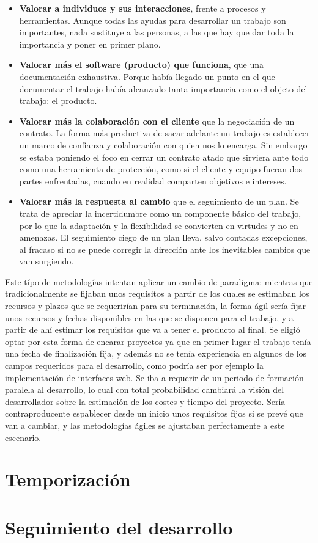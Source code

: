 \begin{itemize}
    \item \textbf{Valorar a individuos y sus interacciones}, frente a procesos y herramientas. Aunque todas las ayudas para desarrollar un trabajo son importantes, nada sustituye a las personas, a las que hay que dar toda la importancia y poner en primer plano.
    \item \textbf{Valorar más el software (producto) que funciona}, que una documentación exhaustiva. Porque había llegado un punto en el que documentar el trabajo había alcanzado tanta importancia como el objeto del trabajo: el producto.
    \item \textbf{Valorar más la colaboración con el cliente} que la negociación de un contrato. La forma más productiva de sacar adelante un trabajo es establecer un marco de confianza y colaboración con quien nos lo encarga. Sin embargo se estaba poniendo el foco en cerrar un contrato atado que sirviera ante todo como una herramienta de protección, como si el cliente y equipo fueran dos partes enfrentadas, cuando en realidad comparten objetivos e intereses.
    \item \textbf{Valorar más la respuesta al cambio} que el seguimiento de un plan. Se trata de apreciar la incertidumbre como un componente básico del trabajo, por lo que la adaptación y la flexibilidad se convierten en virtudes y no en amenazas. El seguimiento ciego de un plan lleva, salvo contadas excepciones, al fracaso si no se puede corregir la dirección ante los inevitables cambios que van surgiendo.
\end{itemize}

Este típo de metodologías intentan aplicar un cambio de paradigma: mientras que tradicionalmente se fijaban unos requisitos a partir de los cuales se estimaban los recursos y plazos que se requerirían para su terminación, la forma ágil sería fijar unos recursos y fechas disponibles en las que se disponen para el trabajo, y a partir de ahí estimar los requisitos que va a tener el producto al final. Se eligió optar por esta forma de encarar proyectos ya que en primer lugar el trabajo tenía una fecha de finalización fíja, y además no se tenía experiencia en algunos de los campos requeridos para el desarrollo, como podría ser por ejemplo la implementación de interfaces web. Se iba a requerir de un periodo de formación paralela al desarrollo, lo cual con total probabilidad cambiará la visión del desarrollador sobre la estimación de los costes y tiempo del proyecto. Sería contraproducente espablecer desde un inicio unos requisitos fijos si se prevé que van a cambiar, y  las metodologías ágiles se ajustaban perfectamente a este escenario.

\section{Temporización}

\section{Seguimiento del desarrollo}
